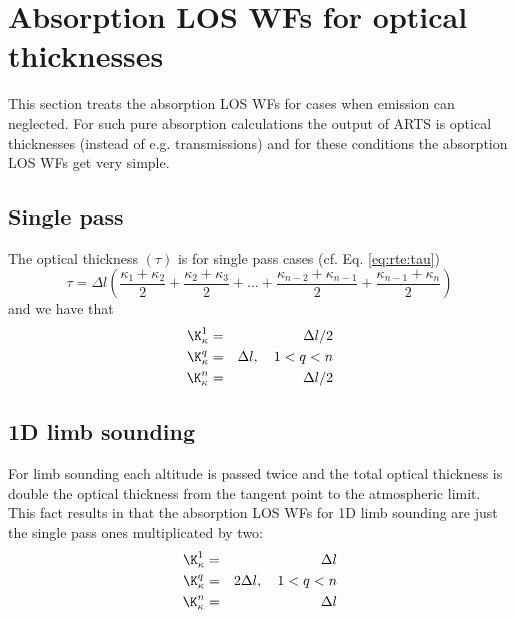 \section{Absorption LOS WFs for optical thicknesses}
 \label{sec:wfuns:absloswfs2}

 This section treats the absorption LOS WFs for cases when emission
 can neglected. For such pure absorption calculations the output
 of ARTS is optical thicknesses (instead of e.g. transmissions) and
 for these conditions the absorption LOS WFs get very simple.

 \subsection{Single pass}
 The optical thickness $(\tau)$ is for single pass cases (cf. Eq. 
 \ref{eq:rte:tau})
 \begin{equation}
   \tau = \Delta l \left( \frac{\kappa_1+\kappa_2}{2} +
                          \frac{\kappa_2+\kappa_3}{2} + \dots +
                          \frac{\kappa_{n-2}+\kappa_{n-1}}{2} +
                          \frac{\kappa_{n-1}+\kappa_n}{2} \right)
 \end{equation}
 and we have that
 \begin{eqnarray}
   \K_{\kappa}^1& = & \Delta l / 2 \nonumber \\
   \K_{\kappa}^q& = & \Delta l, \quad 1<q<n  \\
   \K_{\kappa}^n& = & \Delta l / 2 \nonumber
 \end{eqnarray}


 \subsection{1D limb sounding}
 For limb sounding each altitude is passed twice and the total optical 
 thickness is double the optical thickness from the tangent point to the
 atmospheric limit. This fact results in that the absorption LOS WFs
 for 1D limb sounding are just the single pass ones multiplicated by two:
 \begin{eqnarray}
   \K_{\kappa}^1& = & \Delta l  \nonumber \\
   \K_{\kappa}^q& = & 2 \Delta l, \quad 1<q<n  \\
   \K_{\kappa}^n& = & \Delta l  \nonumber
 \end{eqnarray}
 

